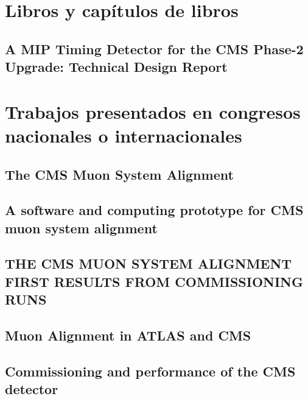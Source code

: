 \documentclass[a4paper, 11pt, twoside, openright]{report}
\begin{document}
\section{Libros y capítulos de libros}

\subsection{A MIP Timing Detector for the CMS Phase-2 Upgrade: Technical Design Report}



\section{Trabajos presentados en congresos nacionales o internacionales}

\subsection{The CMS Muon System Alignment}

\subsection{A software and computing prototype for CMS muon system alignment}

\subsection{THE CMS MUON SYSTEM ALIGNMENT FIRST RESULTS FROM COMMISSIONING RUNS}

\subsection{Muon Alignment in ATLAS and CMS}

\subsection{Commissioning and performance of the CMS detector}

\end{document}
